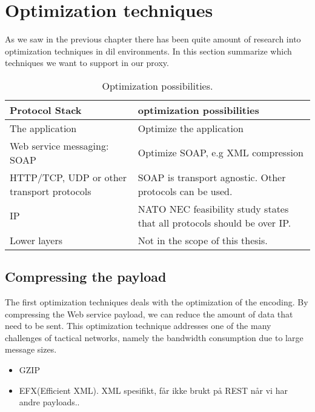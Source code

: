 \section{Optimization techniques}

As we saw in the previous chapter there has been quite amount of research into
optimization techniques in \gls{dil} environments. In this section summarize
which techniques we want to support in our proxy.


\begin{table}[h]
\begin{tabularx}{\textwidth}{| X | X |}
\hline
  \textbf{Protocol Stack} & \textbf{optimization possibilities} \\ \hline
  The application & Optimize the application\\ \hline
  Web service messaging: SOAP & Optimize SOAP, e.g XML compression \\ \hline
  HTTP/TCP, UDP or other transport protocols & SOAP is transport agnostic. Other
  protocols can be used. \\ \hline
  IP & NATO NEC feasibility study states that all protocols should be over IP. \\
  \hline
  Lower layers & Not in the scope of this thesis. \\ \hline
\end{tabularx}
\caption{Optimization possibilities.} \label{table:optimalization-overview}
\end{table}


\subsection{Compressing the payload}

The first optimization techniques deals with the optimization of the encoding.
By compressing the Web service payload, we can reduce the amount of data that
need to be sent. This optimization technique addresses one of the many
challenges of tactical networks, namely the bandwidth consumption due to large
message sizes.

\begin{itemize}
\item GZIP

\item EFX(Efficient XML). XML spesifikt, får ikke brukt på REST når vi har andre
payloads..

\end{itemize}

